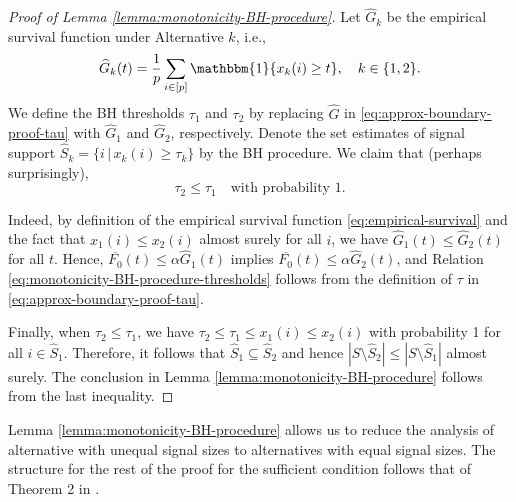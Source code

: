 \begin{proof}[Proof of Lemma \ref{lemma:monotonicity-BH-procedure}]
Let $\widehat{G}_k$ be the empirical survival function under Alternative $k$, i.e.,
\begin{equation} \label{eq:empirical-survival}
    \widehat{G}_k(t) = \frac{1}{p}\sum_{i\in[p]}\mathbbm{1}\{x_k(i) \ge t\}, \quad k\in\{1,2\}.
\end{equation}
We define the BH thresholds $\tau_1$ and $\tau_2$ by replacing $\widehat{G}$ in \eqref{eq:approx-boundary-proof-tau} with $\widehat{G}_1$ and $\widehat{G}_2$, respectively.
Denote the set estimates of signal support $\widehat{S}_k = \{i\,|\,x_k(i)\ge\tau_k\}$ by the BH procedure.
We claim that (perhaps surprisingly),
\begin{equation} \label{eq:monotonicity-BH-procedure-thresholds}
    \tau_2 \le \tau_1 \quad \text{with probability } 1.
\end{equation}

Indeed, by definition of the empirical survival function \eqref{eq:empirical-survival} and the fact that $x_1(i) \le x_2(i)$ almost surely for all $i$,  we have $\widehat{G}_1(t) \le \widehat{G}_2(t)$ for all $t$.
Hence, $\overline{F_0}(t)\le\alpha\widehat{G}_1(t)$ implies $\overline{F_0}(t)\le\alpha\widehat{G}_2(t)$, and Relation \eqref{eq:monotonicity-BH-procedure-thresholds} follows from the definition of $\tau$ in \eqref{eq:approx-boundary-proof-tau}.

Finally, when $\tau_2 \le \tau_1$, we have $\tau_2 \le \tau_1 \le x_1(i) \le x_2(i)$ with probability 1 for all $i\in\widehat{S}_1$.
Therefore, it follows that $\widehat{S}_1 \subseteq \widehat{S}_2$ and hence $|S\setminus\widehat{S}_2| \le |S\setminus\widehat{S}_1|$ almost surely. 
The conclusion in Lemma \ref{lemma:monotonicity-BH-procedure} follows from the last inequality.
\end{proof}

Lemma \ref{lemma:monotonicity-BH-procedure} allows us to reduce the analysis of alternative with unequal signal sizes to alternatives with equal signal sizes. 
The structure for the rest of the proof for the sufficient condition follows that of Theorem 2 in \cite{arias2017distribution}. 

